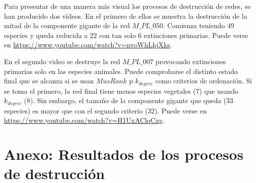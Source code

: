 Para presentar de una manera más visual los procesos de destrucción de redes, se han producido dos vídeos. En el primero de ellos se muestra la destrucción de la mitad de la componente gigante de la red $M\_PL\_050$. Comienza teniendo $49$ especies y queda reducida a $22$ con tan solo $6$ extinciones primarias. Puede verse en \url{https://www.youtube.com/watch?v=nvoWhLhjXks}.

En el segundo video se destruye la red $M\_PL\_007$ provocando extinciones primarias solo en las especies animales. Puede comprobarse el distinto estado final que se alcanza si se usan $MusRank$ p ${k}_{degree}$ como criterios de ordenación. Si se toma el primero, la red final tiene menos especies vegetales ($7$) que usando ${k}_{degree}$ ($8$). Sin embargo, el tamaño de la componente gigante que queda ($33$ especies) es mayor que con el segundo criterio ($32$). Puede verse en \url{https://www.youtube.com/watch?v=H1UxAClqCxg}. 

%
%
%
%
\clearpage
\section{Anexo: Resultados de los procesos de destrucción}
\label{DES_ANEXO_halfgc}


